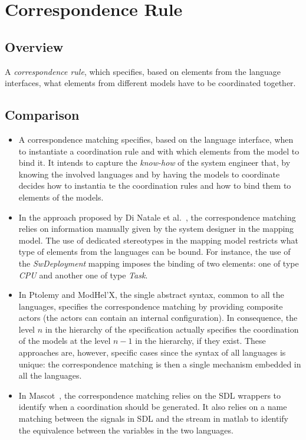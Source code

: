 \section{Correspondence Rule}
	\subsection{Overview}
	A \emph{correspondence rule}, which specifies, based on elements from the language interfaces, what elements from different models have to be coordinated together.
	\subsection{Comparison}
		\begin{itemize}
			\item A correspondence matching specifies, based on the language interface, when to instantiate a coordination rule and with which elements from the model to bind it.
			It intends to capture the \emph{know-how} of the system engineer that, by knowing the involved languages and by having the models to coordinate decides how to instantia           te the coordination rules and how to bind them to elements of the models.
			
			\item In the approach proposed by Di Natale et al.~\cite{dinatale}, the correspondence matching relies on information manually given by the system designer in the mapping model. The use of dedicated stereotypes in the mapping model restricts what type of elements from the languages can be bound. For instance, the use of the \emph{SwDeployment} mapping imposes the binding of two elements: one of type \emph{CPU} and another one of type \emph{Task}. 			
			\item In Ptolemy and ModHel'X, the single abstract syntax, common to all the languages, specifies the correspondence matching by providing composite actors (\ie the actors can contain an internal configuration). In consequence, the level $n$ in the hierarchy of the specification actually specifies the coordination of the models at the level $n-1$ in the hierarchy, if they exist. These approaches are, however, specific cases since the syntax of all languages is unique: the correspondence matching is then a single mechanism embedded in all the languages.
			
			\item In Mascot~\cite{mascotbib}, the correspondence matching relies on the SDL wrappers to identify when a coordination should be generated. It also relies on a name matching between the signals in SDL and the stream in matlab to identify the equivalence between the variables in the two languages. 
		\end{itemize}
